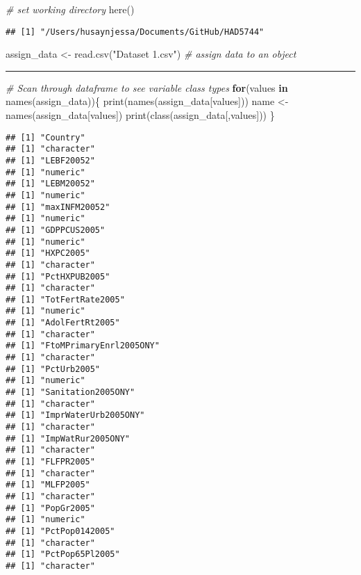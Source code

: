 \documentclass[
]{article}
\newenvironment{Shaded}{\begin{snugshade}}{\end{snugshade}}
\newcommand{\CommentTok}[1]{\textcolor[rgb]{0.56,0.35,0.01}{\textit{#1}}}
\newcommand{\ControlFlowTok}[1]{\textcolor[rgb]{0.13,0.29,0.53}{\textbf{#1}}}
\newcommand{\FunctionTok}[1]{\textcolor[rgb]{0.00,0.00,0.00}{#1}}
\newcommand{\NormalTok}[1]{#1}
\newcommand{\OtherTok}[1]{\textcolor[rgb]{0.56,0.35,0.01}{#1}}
\newcommand{\StringTok}[1]{\textcolor[rgb]{0.31,0.60,0.02}{#1}}
\begin{document}
\begin{Shaded}
\begin{Highlighting}[]
\CommentTok{\# set working directory}
\FunctionTok{here}\NormalTok{()}
\end{Highlighting}
\end{Shaded}

\begin{verbatim}
## [1] "/Users/husaynjessa/Documents/GitHub/HAD5744"
\end{verbatim}

\begin{Shaded}
\begin{Highlighting}[]
\NormalTok{assign\_data }\OtherTok{\textless{}{-}} \FunctionTok{read.csv}\NormalTok{(}\StringTok{"Dataset 1.csv"}\NormalTok{) }\CommentTok{\# assign data to an object}
\end{Highlighting}
\end{Shaded}

\begin{center}\rule{0.5\linewidth}{0.5pt}\end{center}

\begin{Shaded}
\begin{Highlighting}[]
\CommentTok{\# Scan through dataframe to see variable class types}
\ControlFlowTok{for}\NormalTok{(values }\ControlFlowTok{in} \FunctionTok{names}\NormalTok{(assign\_data))\{}
  \FunctionTok{print}\NormalTok{(}\FunctionTok{names}\NormalTok{(assign\_data[values]))}
\NormalTok{  name }\OtherTok{\textless{}{-}} \FunctionTok{names}\NormalTok{(assign\_data[values])}
  \FunctionTok{print}\NormalTok{(}\FunctionTok{class}\NormalTok{(assign\_data[,values]))}
\NormalTok{\}}
\end{Highlighting}
\end{Shaded}

\begin{verbatim}
## [1] "Country"
## [1] "character"
## [1] "LEBF20052"
## [1] "numeric"
## [1] "LEBM20052"
## [1] "numeric"
## [1] "maxINFM20052"
## [1] "numeric"
## [1] "GDPPCUS2005"
## [1] "numeric"
## [1] "HXPC2005"
## [1] "character"
## [1] "PctHXPUB2005"
## [1] "character"
## [1] "TotFertRate2005"
## [1] "numeric"
## [1] "AdolFertRt2005"
## [1] "character"
## [1] "FtoMPrimaryEnrl2005ONY"
## [1] "character"
## [1] "PctUrb2005"
## [1] "numeric"
## [1] "Sanitation2005ONY"
## [1] "character"
## [1] "ImprWaterUrb2005ONY"
## [1] "character"
## [1] "ImpWatRur2005ONY"
## [1] "character"
## [1] "FLFPR2005"
## [1] "character"
## [1] "MLFP2005"
## [1] "character"
## [1] "PopGr2005"
## [1] "numeric"
## [1] "PctPop0142005"
## [1] "character"
## [1] "PctPop65Pl2005"
## [1] "character"
\end{verbatim}
\end{document}
